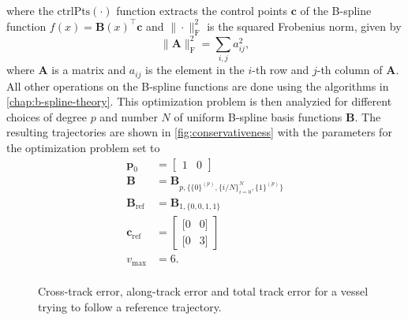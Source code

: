 where the $\text{ctrlPts}(\cdot)$ function extracts the control points $\mathbf c$ of the B-spline function $f(x)=\mathbf B(x)^\top\mathbf c$ and $\|\cdot\|_\text{F}^2$ is the squared Frobenius norm, given by
\begin{equation}
    \|\mathbf A\|_\text{F}^2 = \sum_{i,j} a_{ij}^2,
\end{equation}
where $\mathbf A$ is a matrix and $a_{ij}$ is the element in the $i$-th row and $j$-th column of $\mathbf A$. All other operations on the B-spline functions are done using the algorithms in \cref{chap:b-spline-theory}. 
This optimization problem is then analyzied for different choices of degree $p$ and number $N$ of uniform B-spline basis functions $\mathbf B$. The resulting trajectories are shown in \cref{fig:conservativeness} with the parameters for the optimization problem set to
\begin{equation}\label{eq:conservativeness-parameters}
    \begin{aligned}
        \mathbf p_0 &= \begin{bmatrix} 1 & 0 \end{bmatrix} \\
        \mathbf B &= \mathbf B_{p,
            \{
                \{0\}^{(p)}, \{i/N\}_{i=0}^{N}, \{1\}^{(p)}
            \}} \\
        \mathbf B_\text{ref} &= \mathbf B_{1,\{0, 0, 1, 1\}} \\
        \mathbf c_\text{ref} &= \begin{bmatrix}
            [0 & 0] \\
            [0 & 3]
        \end{bmatrix} \\
        v_\text{max} &= 6. \\
    \end{aligned}
\end{equation}

\begin{figure}
    \centering
    
    \caption{Cross-track error, along-track error and total track error for a vessel trying to follow a reference trajectory.}
    \label{fig:cross-track-along-track-error}
\end{figure}

